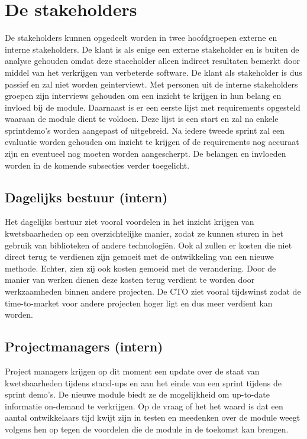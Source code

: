 \section{De stakeholders}\label{sec:de-stakeholders}

De stakeholders kunnen opgedeelt worden in twee hoofdgroepen externe en interne stakeholders.
De klant is als enige een externe stakeholder en is buiten de analyse gehouden omdat deze staceholder alleen indirect resultaten bemerkt door middel van het verkrijgen van verbeterde software.
De klant als stakeholder is dus passief en zal niet worden geinterviewt.
Met personen uit de interne stakeholders groepen zijn interviews gehouden om een inzicht te krijgen in hun belang en invloed bij de module.
Daarnaast is er een eerste lijst met requirements opgesteld waaraan de module dient te voldoen.
Deze lijst is een start en zal na enkele sprintdemo's worden aangepast of uitgebreid.
Na iedere tweede sprint zal een evaluatie worden gehouden om inzicht te krijgen of de requirements nog accuraat zijn en eventueel nog moeten worden aangescherpt.
De belangen en invloeden worden in de komende subsecties verder toegelicht.

\subsection{Dagelijks bestuur (intern)}\label{subsec:dagelijks-bestuur-(intern)}
Het dagelijks bestuur ziet vooral voordelen in het inzicht krijgen van kwetsbaarheden op een overzichtelijke manier, zodat ze kunnen sturen in het gebruik van biblioteken of andere technologiën. Ook al zullen er kosten die niet direct terug te verdienen zijn gemoeit met de ontwikkeling van een nieuwe methode.
Echter, zien zij ook kosten gemoeid met de verandering.
Door de manier van werken dienen deze kosten terug verdient te worden door werkzaamheden binnen andere projecten.
De CTO ziet vooral tijdswinst zodat de time-to-market voor andere projecten hoger ligt en dus meer verdient kan worden.
\subsection{Projectmanagers (intern)}\label{subsec:projectmanagers-(intern)}
Project managers krijgen op dit moment een update over de staat van kwetsbaarheden tijdens stand-ups en aan het einde van een sprint tijdens de sprint demo's.
De nieuwe module biedt ze de mogelijkheid om up-to-date informatie on-demand te verkrijgen.
Op de vraag of het het waard is dat een aantal ontwikkelaars tijd kwijt zijn in testen en meedenken over de module weegt volgens hen op tegen de voordelen die de module in de toekomst kan brengen.
